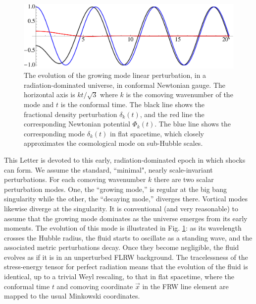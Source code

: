 \documentclass[prl,aps,10pt,twocolumn,showkeys,nofootinbib]{revtex4-1}
\begin{document}
\begin{figure}[htp]
\includegraphics[scale=0.35]{modesfig.pdf}
\caption{The evolution of the growing mode linear perturbation, in a radiation-dominated universe, in conformal Newtonian gauge. The horizontal axis is $kt/\sqrt{3}$ where $k$ is the comoving wavenumber of the mode and $t$ is the conformal time. The black line shows the fractional density perturbation $\delta_k(t)$, and the red line the corresponding Newtonian potential $\Phi_k(t)$. The blue line shows the corresponding mode $\delta_k(t)$ in flat spacetime, which closely approximates the cosmological mode on sub-Hubble scales.}
\label{modesfig}
\end{figure}

This Letter is devoted to this early, radiation-dominated epoch in which shocks can form. We assume the standard, ``minimal", nearly scale-invariant perturbations. For each comoving wavenumber $k$ there are two scalar perturbation modes. One, the ``growing mode,'' is regular at the big bang singularity while the other, the ``decaying mode,'' diverges there. Vortical modes likewise diverge at the singularity. It is conventional (and very reasonable) to assume that the growing mode dominates as the universe emerges from its early moments. The evolution of this mode is illustrated in Fig. \ref{modesfig}: as its wavelength crosses the Hubble radius, the fluid starts to oscillate as a standing wave, and the associated metric perturbations decay. Once they become negligible, the fluid evolves as if it is in an unperturbed FLRW background. The tracelessness of the stress-energy tensor for perfect radiation means that the evolution of the fluid is identical, up to a trivial Weyl rescaling, to that in flat spacetime, where the conformal time $t$ and comoving coordinate $\vec{x}$ in the FRW line element are mapped to the usual Minkowski coordinates. 
\end{document}
